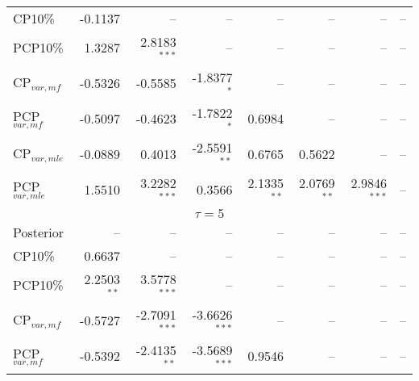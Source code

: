 {{\begin{table}
\begin{tabular}{l | rrrrrrr}
CP10\% & -0.1137\phantom{$^{***}$} &    --\phantom{$^{***}$} &    --\phantom{$^{***}$} &    --\phantom{$^{***}$} &    --\phantom{$^{***}$} &    --\phantom{$^{***}$} &    --\phantom{$^{***}$}   \\ 
PCP10\% & 1.3287\phantom{$^{***}$} & 2.8183$^{***}$ &    --\phantom{$^{***}$} &    --\phantom{$^{***}$} &    --\phantom{$^{***}$} &    --\phantom{$^{***}$} &    --\phantom{$^{***}$}   \\ 
CP$_{var,mf}$ & -0.5326\phantom{$^{***}$} & -0.5585\phantom{$^{***}$} & -1.8377$^{*}$\phantom{$^{**}$} &    --\phantom{$^{***}$} &    --\phantom{$^{***}$} &    --\phantom{$^{***}$} &    --\phantom{$^{***}$}   \\ 
PCP$_{var,mf}$ & -0.5097\phantom{$^{***}$} & -0.4623\phantom{$^{***}$} & -1.7822$^{*}$\phantom{$^{**}$} & 0.6984\phantom{$^{***}$} &    --\phantom{$^{***}$} &    --\phantom{$^{***}$} &    --\phantom{$^{***}$}   \\ 
CP$_{var,mle}$ & -0.0889\phantom{$^{***}$} & 0.4013\phantom{$^{***}$} & -2.5591$^{**}$\phantom{$^{*}$} & 0.6765\phantom{$^{***}$} & 0.5622\phantom{$^{***}$} &    --\phantom{$^{***}$} &    --\phantom{$^{***}$}   \\ 
PCP$_{var,mle}$ & 1.5510\phantom{$^{***}$} & 3.2282$^{***}$ & 0.3566\phantom{$^{***}$} & 2.1335$^{**}$\phantom{$^{*}$} & 2.0769$^{**}$\phantom{$^{*}$} & 2.9846$^{***}$ &    --\phantom{$^{***}$}   \\ 
\hline 
%
%
\multicolumn{8}{c}{$\tau = 5$} \\ \hline 
Posterior &    --\phantom{$^{***}$} &    --\phantom{$^{***}$} &    --\phantom{$^{***}$} &    --\phantom{$^{***}$} &    --\phantom{$^{***}$} &    --\phantom{$^{***}$} &    --\phantom{$^{***}$}   \\ 
CP10\% & 0.6637\phantom{$^{***}$} &    --\phantom{$^{***}$} &    --\phantom{$^{***}$} &    --\phantom{$^{***}$} &    --\phantom{$^{***}$} &    --\phantom{$^{***}$} &    --\phantom{$^{***}$}   \\ 
PCP10\% & 2.2503$^{**}$\phantom{$^{*}$} & 3.5778$^{***}$ &    --\phantom{$^{***}$} &    --\phantom{$^{***}$} &    --\phantom{$^{***}$} &    --\phantom{$^{***}$} &    --\phantom{$^{***}$}   \\ 
CP$_{var,mf}$ & -0.5727\phantom{$^{***}$} & -2.7091$^{***}$ & -3.6626$^{***}$ &    --\phantom{$^{***}$} &    --\phantom{$^{***}$} &    --\phantom{$^{***}$} &    --\phantom{$^{***}$}   \\ 
PCP$_{var,mf}$ & -0.5392\phantom{$^{***}$} & -2.4135$^{**}$\phantom{$^{*}$} & -3.5689$^{***}$ & 0.9546\phantom{$^{***}$} &    --\phantom{$^{***}$} &    --\phantom{$^{***}$} &    --\phantom{$^{***}$}   \\ 

\end{tabular}
\end{table}}}
